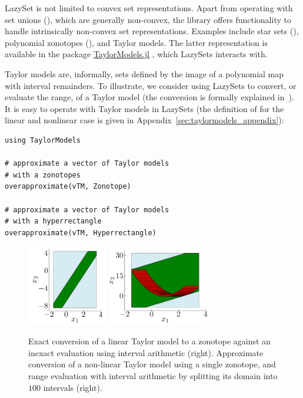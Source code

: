 LazySet is not limited to convex set representations. Apart from operating with set unions (), which are generally non-convex, the library offers functionality to handle intrinsically non-convex set representations.
%
Examples include star sets (), polynomial zonotopes (), and Taylor models. The latter representation is available in the package \href{https://github.com/JuliaIntervals/TaylorModels.jl}{TaylorModels.jl} \cite{TaylorModels.jl,BenetFSS19}, which LazySets interacts with.

\smallskip

Taylor models are, informally, sets defined by the image of a polynomial map with interval remainders.
%
To illustrate, we consider using LazySets to convert, or evaluate the range, of a Taylor model (the conversion is formally explained in~\cite{schilling2021verification}).
%
It is easy to operate with Taylor models in LazySets (the definition of  for the linear and nonlinear case is given in Appendix~\ref{sec:taylormodels_appendix}):

\begin{minipage}{\linewidth}
	\begin{lstlisting}
using TaylorModels

# approximate a vector of Taylor models
# with a zonotopes
overapproximate(vTM, Zonotope)

# approximate a vector of Taylor models
# with a hyperrectangle
overapproximate(vTM, Hyperrectangle)
	\end{lstlisting}
\end{minipage}

\begin{figure}
	\centering
	\includegraphics[height=3.5cm, keepaspectratio]{img/taylormodel_linear}
	\includegraphics[height=3.5cm, keepaspectratio]{img/taylormodel_nonlinear}
	\caption{Exact conversion of a linear Taylor model to a zonotope against an inexact evaluation using interval arithmetic (right). Approximate conversion of a non-linear Taylor model using a single zonotope, and range evaluation with interval arithmetic by splitting its domain into $100$ intervals (right).}
	\label{fig:taylormodelsconversion}
\end{figure}

